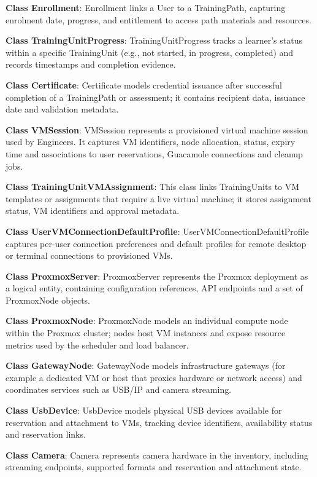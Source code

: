 \textbf{Class Enrollment}: Enrollment links a User to a TrainingPath, capturing
enrolment date, progress, and entitlement to access path materials and
resources.

\textbf{Class TrainingUnitProgress}: TrainingUnitProgress tracks a learner's
status within a specific TrainingUnit (e.g., not started, in progress,
completed) and records timestamps and completion evidence.

\textbf{Class Certificate}: Certificate models credential issuance after
successful completion of a TrainingPath or assessment; it contains recipient
data, issuance date and validation metadata.

\textbf{Class VMSession}: VMSession represents a provisioned virtual machine
session used by Engineers. It captures VM identifiers, node allocation, status,
expiry time and associations to user reservations, Guacamole connections and
cleanup jobs.

\textbf{Class TrainingUnitVMAssignment}: This class links TrainingUnits to VM
templates or assignments that require a live virtual machine; it stores
assignment status, VM identifiers and approval metadata.

\textbf{Class UserVMConnectionDefaultProfile}: UserVMConnectionDefaultProfile
captures per-user connection preferences and default profiles for remote desktop
or terminal connections to provisioned VMs.

\textbf{Class ProxmoxServer}: ProxmoxServer represents the Proxmox deployment
as a logical entity, containing configuration references, API endpoints and a
set of ProxmoxNode objects.

\textbf{Class ProxmoxNode}: ProxmoxNode models an individual compute node
within the Proxmox cluster; nodes host VM instances and expose resource metrics
used by the scheduler and load balancer.

\textbf{Class GatewayNode}: GatewayNode models infrastructure gateways (for
example a dedicated VM or host that proxies hardware or network access) and
coordinates services such as USB/IP and camera streaming.

\textbf{Class UsbDevice}: UsbDevice models physical USB devices available for
reservation and attachment to VMs, tracking device identifiers, availability
status and reservation links.

\textbf{Class Camera}: Camera represents camera hardware in the inventory,
including streaming endpoints, supported formats and reservation and attachment
state.

